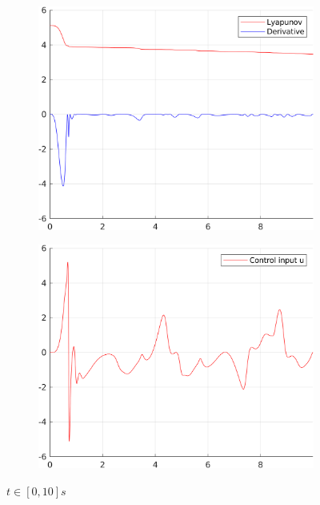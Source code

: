 \documentclass[12pt,a4paper]{article}
\begin{document}
\begin{figure}[H]
\begin{subfigure}{.45\textwidth}
			\includegraphics[width=1\textwidth]{Graphics/NonLinearLyapunov1.png}
		\end{subfigure}%
		\begin{subfigure}{.45\textwidth}
			\centering
			\includegraphics[width=1\textwidth]{Graphics/NonLinearControl1.png}
		\end{subfigure}
		\caption{$t \in [0,10]s$}
	\end{figure}
\end{document}
